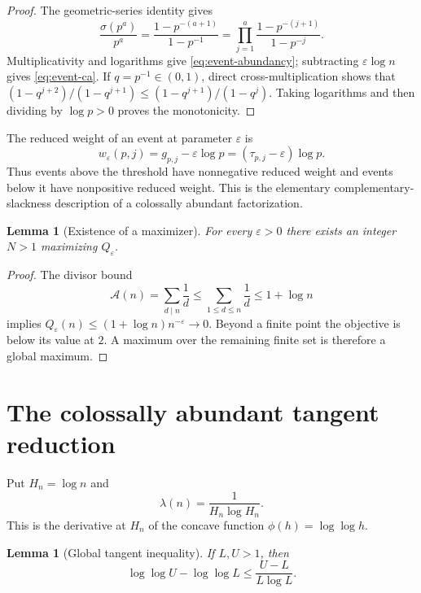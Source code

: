 \documentclass[11pt]{amsart}
\newtheorem{lemma}[theorem]{Lemma}
\theoremstyle{definition}
\theoremstyle{remark}
\numberwithin{equation}{section}
\newcommand{\sig}{\sigma}
\newcommand{\A}{\mathcal{A}}
\newcommand{\eps}{\varepsilon}
\begin{document}
\begin{proof}
The geometric-series identity gives
\[
  \frac{\sig(p^a)}{p^a}
  =\frac{1-p^{-(a+1)}}{1-p^{-1}}
  =\prod_{j=1}^{a}
    \frac{1-p^{-(j+1)}}{1-p^{-j}}.
\]
Multiplicativity and logarithms give \eqref{eq:event-abundancy}; subtracting
$\eps\log n$ gives \eqref{eq:event-ca}.  If $q=p^{-1}\in(0,1)$, direct
cross-multiplication shows that
$(1-q^{j+2})/(1-q^{j+1})\le(1-q^{j+1})/(1-q^j)$.
Taking logarithms and then dividing by $\log p>0$ proves the monotonicity.
\end{proof}

The reduced weight of an event at parameter $\eps$ is
\begin{equation}\label{eq:reduced-weight}
  w_{\eps}(p,j)=g_{p,j}-\eps\log p
               =(\tau_{p,j}-\eps)\log p.
\end{equation}
Thus events above the threshold have nonnegative reduced weight and events
below it have nonpositive reduced weight.  This is the elementary
complementary-slackness description of a colossally abundant factorization.

\begin{lemma}[Existence of a maximizer]\label{lem:ca-exists}
For every $\eps>0$ there exists an integer $N>1$ maximizing $Q_{\eps}$.
\end{lemma}

\begin{proof}
The divisor bound
\[
  \A(n)=\sum_{d\mid n}\frac1d
  \le \sum_{1\le d\le n}\frac1d
  \le 1+\log n
\]
implies
$Q_{\eps}(n)\le(1+\log n)n^{-\eps}\to0$.  Beyond a finite point the
objective is below its value at $2$.  A maximum over the remaining finite
set is therefore a global maximum.
\end{proof}

\section{The colossally abundant tangent reduction}\label{sec:extremal}

Put $H_n=\log n$ and
\begin{equation}\label{eq:lambda}
  \lambda(n)=\frac1{H_n\log H_n}.
\end{equation}
This is the derivative at $H_n$ of the concave function
$\phi(h)=\log\log h$.

\begin{lemma}[Global tangent inequality]\label{lem:tangent}
If $L,U>1$, then
\begin{equation}\label{eq:tangent}
  \log\log U-\log\log L
  \le \frac{U-L}{L\log L}.
\end{equation}
\end{lemma}
\end{document}
